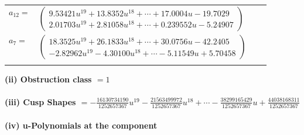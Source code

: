 \documentclass[1p]{elsarticle_modified}
\theoremstyle{definition}
\begin{document}
\begin{tabular}{m{7pt} m{180pt} m{7pt} m{180pt} }
\flushright $a_{12}=$&$\begin{pmatrix}9.53421 u^{19}+13.8352 u^{18}+\cdots+17.0004 u-19.7029\\2.01703 u^{19}+2.81058 u^{18}+\cdots+0.239552 u-5.24907\end{pmatrix}$ \\
\flushright $a_{7}=$&$\begin{pmatrix}18.3525 u^{19}+26.1833 u^{18}+\cdots+30.0756 u-42.2405\\-2.82962 u^{19}-4.30100 u^{18}+\cdots-5.11549 u+5.70458\end{pmatrix}$\\&\end{tabular}
\flushleft \textbf{(ii) Obstruction class $= 1$}\\~\\
\flushleft \textbf{(iii) Cusp Shapes $= -\frac{16130734190}{1252657367} u^{19}-\frac{21563499972}{1252657367} u^{18}+\cdots-\frac{38299165429}{1252657367} u+\frac{44038168311}{1252657367}$}\\~\\
\newpage\renewcommand{\arraystretch}{1}
\flushleft \textbf{(iv) u-Polynomials at the component}\newline \\
\end{document}
